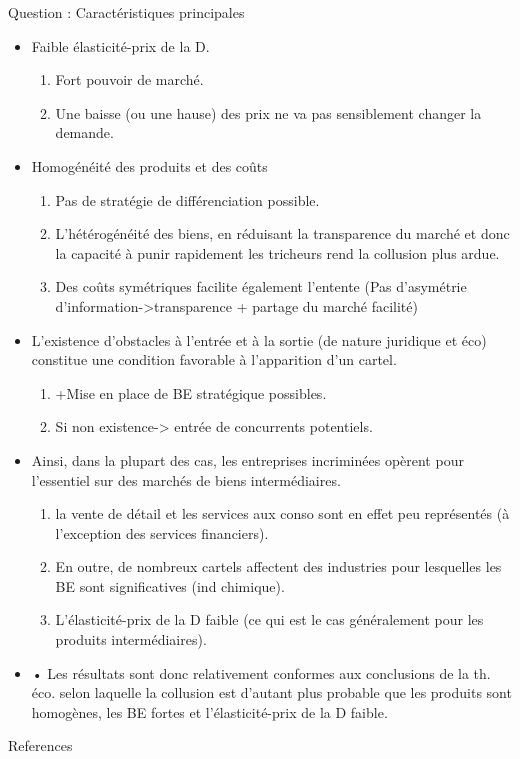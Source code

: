 \begin{frame}[allowframebreaks]{Question : Caractéristiques principales}
    \begin{itemize}
        \item Faible élasticité-prix de la D.
        \begin{enumerate}[-]
        \item Fort pouvoir de marché.
        \item Une baisse (ou une hause) des prix ne va pas
        sensiblement changer la demande.
        \end{enumerate}
        \item Homogénéité des produits et des coûts
        \begin{enumerate}[-]
        \item Pas de stratégie de différenciation possible.
        \item L’hétérogénéité des biens, en réduisant la transparence du
        marché et donc la capacité à punir rapidement les tricheurs
        rend la collusion plus ardue.
        \item Des coûts symétriques facilite également l’entente (Pas
        d’asymétrie d’information->transparence + partage du marché facilité)
       \end{enumerate}
       \item L’existence d’obstacles à l’entrée et à la sortie (de nature juridique et éco) 
       constitue une condition favorable à l’apparition d’un cartel.
       \begin{enumerate}[-]
       \item +Mise en place de BE stratégique possibles.
       \item Si non existence-> entrée de concurrents potentiels.
    \end{enumerate}
    \item Ainsi, dans la plupart des cas, les entreprises incriminées opèrent pour
     l’essentiel sur des marchés de biens intermédiaires.
     \begin{enumerate}[-]
    \item la vente de détail et les services aux conso sont en effet peu représentés (à l’exception des services financiers).
    \item En outre, de nombreux cartels affectent des industries pour lesquelles les BE sont significatives (ind chimique).
    \item L’élasticité-prix de la D faible (ce qui est le cas généralement pour les produits intermédiaires).
     \end{enumerate}
    \item • Les résultats sont donc relativement conformes aux conclusions de la th. éco. selon laquelle la collusion est d’autant 
    plus probable que les produits sont homogènes, les BE fortes et l’élasticité-prix de la D faible.
    \end{itemize}
\end{frame}
   
\begin{frame}[allowframebreaks]{References}


\end{frame}


